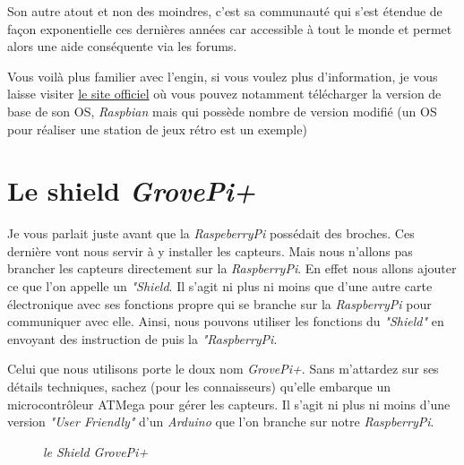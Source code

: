 Son autre atout et non des moindres, c'est sa communauté qui s'est étendue de façon exponentielle ces dernières années car accessible à tout le monde et permet alors une aide conséquente via les forums.

Vous voilà plus familier avec l'engin, si vous voulez plus d'information, je vous laisse visiter \href{https://www.raspberrypi.org/}{le site officiel} où vous pouvez notamment télécharger la version de base de son OS, \textit{Raspbian} mais qui possède nombre de version modifié (un OS pour réaliser une station de jeux rétro est un exemple)

\section{Le shield \textit{GrovePi+}}

Je vous parlait juste avant que la \textit{RaspeberryPi} possédait des broches. Ces dernière vont nous servir à y installer les capteurs. Mais nous n'allons pas brancher les capteurs directement sur la \textit{RaspberryPi}. En effet nous allons ajouter ce que l'on appelle un \textit{"Shield}. Il s'agit ni plus ni moins que d'une autre carte électronique avec ses fonctions propre qui se branche sur la \textit{RaspberryPi} pour communiquer avec elle. Ainsi, nous pouvons utiliser les fonctions du \textit{"Shield"} en envoyant des instruction de puis la \textit{"RaspberryPi}.

Celui que nous utilisons porte le doux nom \textit{GrovePi+}. Sans m'attardez sur ses détails techniques, sachez (pour les connaisseurs) qu'elle embarque un microcontrôleur ATMega pour gérer les capteurs. Il s'agit ni plus ni moins d'une version \textit{"User Friendly"} d'un \textit{Arduino} que l'on branche sur notre \textit{RaspberryPi}.\\

\begin{figure}[H]
\begin{center}
\end{center}
	\caption{ \textit{le Shield GrovePi+}}
\end{figure}\\


